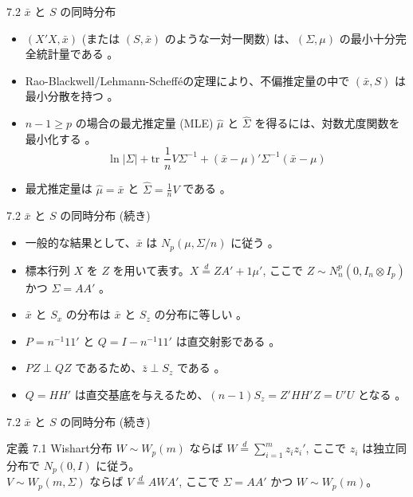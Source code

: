 \documentclass[aspectratio=169]{beamer}
\begin{document}
\begin{CJK}{UTF8}{min}
\begin{frame}{7.2 $\bar{x}$ と $S$ の同時分布}
\begin{itemize}
    \item $(X'X, \bar{x})$ (または $(S, \bar{x})$ のような一対一関数) は、$(\Sigma, \mu)$ の最小十分完全統計量である 。
    \item Rao-Blackwell/Lehmann-Scheff\'eの定理により、不偏推定量の中で $(\bar{x}, S)$ は最小分散を持つ 。
    \item $n-1 \ge p$ の場合の最尤推定量 (MLE) $\hat{\mu}$ と $\hat{\Sigma}$ を得るには、対数尤度関数を最小化する 。
    \begin{equation*}
    \ln |\Sigma| + \text{tr }\frac{1}{n}V\Sigma^{-1} + (\bar{x} - \mu)'\Sigma^{-1}(\bar{x} - \mu) \tag{7.2}
    \end{equation*}
    \item 最尤推定量は $\hat{\mu} = \bar{x}$ と $\hat{\Sigma} = \frac{1}{n}V$ である 。
\end{itemize}
\end{frame}

\begin{frame}{7.2 $\bar{x}$ と $S$ の同時分布 (続き)}
\begin{itemize}
    \item 一般的な結果として、$\bar{x}$ は $N_p(\mu, \Sigma/n)$ に従う 。
    \item 標本行列 $X$ を $Z$ を用いて表す。$X \overset{d}{=} ZA' + 1\mu'$, ここで $Z \sim N_n^p(0, I_n \otimes I_p)$ かつ $\Sigma=AA'$ 。
    \item $\bar{x}$ と $S_x$ の分布は $\bar{x}$ と $S_z$ の分布に等しい 。
    \item $P=n^{-1}11'$ と $Q=I-n^{-1}11'$ は直交射影である 。
    \item $PZ \perp QZ$ であるため、$\bar{z} \perp S_z$ である 。
    \item $Q=HH'$ は直交基底を与えるため、$(n-1)S_z = Z'HH'Z = U'U$ となる 。
\end{itemize}
\end{frame}

\begin{frame}{7.2 $\bar{x}$ と $S$ の同時分布 (続き)}
\begin{block}{定義 7.1 Wishart分布}
$W \sim W_p(m)$ ならば $W \overset{d}{=} \sum_{i=1}^{m} z_i z_i'$, ここで $z_i$ は独立同分布で $N_p(0, I)$ に従う。\\
$V \sim W_p(m, \Sigma)$ ならば $V \overset{d}{=} AWA'$, ここで $\Sigma=AA'$ かつ $W \sim W_p(m)$。
\end{block}


\end{frame}
\end{CJK}
\end{document}
